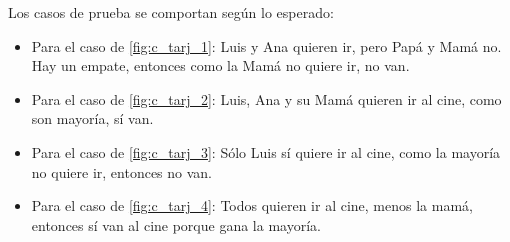 \documentclass[../procedimientos.tex]{subfiles}
\begin{document}
Los casos de prueba se comportan según lo esperado:
\begin{itemize}
  \item Para el caso de \ref{fig:c_tarj_1}: Luis y Ana quieren ir, pero Papá y 
  Mamá no. Hay un empate, entonces como la Mamá no quiere ir, no van.
  \item Para el caso de \ref{fig:c_tarj_2}: Luis, Ana y su Mamá quieren ir al 
    cine, como son mayoría, sí van.
  \item Para el caso de \ref{fig:c_tarj_3}: Sólo Luis sí quiere ir al cine, 
    como la mayoría no quiere ir, entonces no van.
  \item Para el caso de \ref{fig:c_tarj_4}: Todos quieren ir al cine, menos la 
    mamá, entonces sí van al cine porque gana la mayoría.
\end{itemize}
\end{document}
